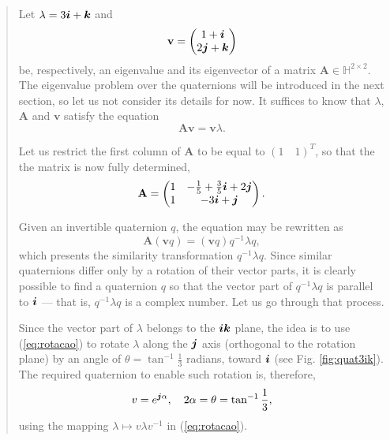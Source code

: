\vspace{-2em}
\begin{quotation}
    \begin{example}
        \label{example:01}
        \upshape
        Let $ \lambda = 3\boldsymbol{i} + \boldsymbol{k} $ and
        \begin{equation}
            \mathbf{v} =\begin{pmatrix}
                1 +  \boldsymbol{i} \\
                2 \boldsymbol{j} + \boldsymbol{k}
            \end{pmatrix}
        \end{equation}
        be, respectively, an eigenvalue and its eigenvector of a matrix $\mathbf{A} \in \mathbb{H}^{2 \times 2}$. The eigenvalue problem over the quaternions will be introduced in the next section, so let us not consider its details for now. It suffices to know that $\lambda$, $\mathbf{A}$ and $\mathbf{v}$ satisfy the equation
        \begin{equation}
            \label{eq:03}
            \mathbf{A} \mathbf{v} = \mathbf{v} \lambda.
        \end{equation}

        Let us restrict the first column of $\mathbf{A}$ to be equal to $ (1 \quad 1)^T $, so that the the matrix is now fully determined,
        \begin{equation}
            \mathbf{A} =
            \begin{pmatrix}
                1 & - \frac{1}{5} + \frac{3}{5} \boldsymbol{i} + 2 \boldsymbol{j} \\
                1 & -3 \boldsymbol{i} + \boldsymbol{j}
            \end{pmatrix}.
        \end{equation}

        Given an invertible quaternion $q$, the equation may be rewritten as
        \begin{equation}
            \label{eq:rewritten}
            \mathbf{A} (\mathbf{v} q) = (\mathbf{v} q) q^{-1} \lambda q,
        \end{equation}
        which presents the similarity transformation $q^{-1} \lambda q$. Since similar quaternions differ only by a rotation of their vector parts, it is clearly possible to find a quaternion $q$ so that the vector part of $q^{-1} \lambda q$ is parallel to $\boldsymbol{i}$ --- that is, $q^{-1} \lambda q$ is a complex number. Let us go through that process.

        Since the vector part of $\lambda$ belongs to the $ \boldsymbol{i} \boldsymbol{k} $ plane, the idea is to use (\ref{eq:rotacao}) to rotate $\lambda$ along the $\boldsymbol{j}$ axis (orthogonal to the rotation plane) by an angle of $ \theta = \tan^{-1} \frac{1}{3} $ radians, toward $ \boldsymbol{i} $ (see Fig. \ref{fig:quat3ik}). The required quaternion to enable such rotation is, therefore,
        \begin{equation}
            \label{eq:04}
            v = e^{\boldsymbol{j} \alpha}, \quad 2\alpha = \theta = \tan^{-1} \frac{1}{3},
        \end{equation}
        using the mapping $ \lambda \mapsto v \lambda v^{-1} $ in (\ref{eq:rotacao}).


\end{example}
\end{quotation}
